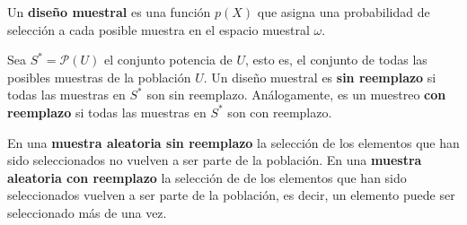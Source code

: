 \begin{definition}
    Un \textbf{diseño muestral} es una función $p(X)$ que asigna una probabilidad de selección a cada posible muestra en el espacio muestral $\omega$.

    \bigbreak

    Sea $S^* = \mathcal{P}(U)$ el conjunto potencia de $U$, esto es, el conjunto de todas las posibles muestras de la población $U$. Un diseño muestral es \textbf{sin reemplazo} si todas las muestras en $S^*$ son sin reemplazo. Análogamente, es un muestreo \textbf{con reemplazo} si todas las muestras en $S^*$ son con reemplazo.

    \bigbreak

    En una \textbf{muestra aleatoria sin reemplazo} la selección de los elementos que han sido seleccionados no vuelven a ser parte de la población. En una \textbf{muestra aleatoria con reemplazo} la selección de de los elementos que han sido seleccionados vuelven a ser parte de la población, es decir, un elemento puede ser seleccionado más de una vez.
\end{definition}
